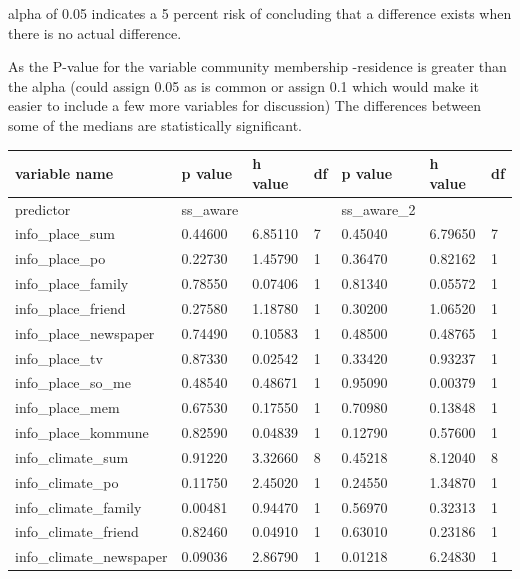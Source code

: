 alpha of 0.05 indicates a 5 percent
risk of concluding that a difference exists when there is no actual difference.

As the P-value for the variable community membership -residence is greater than the alpha (could assign 0.05 as is common or assign 0.1 which would make it easier to include a few more variables for discussion) The differences between some of the medians are statistically significant.

\begin{table}[h]
    \centering
    \begin{tabular}{|l|l|l|l|l|l|l|}
    \hline
        variable name & p value & h value & df & p value & h value & df \\ \hline
        predictor & ss\_aware & ~ & ~ & ss\_aware\_2 & ~ & ~ \\ \hline
        info\_place\_sum & 0.44600 & 6.85110 & 7 & 0.45040 & 6.79650 & 7 \\ \hline
        info\_place\_po & 0.22730 & 1.45790 & 1 & 0.36470 & 0.82162 & 1 \\ \hline
        info\_place\_family & 0.78550 & 0.07406 & 1 & 0.81340 & 0.05572 & 1 \\ \hline
        info\_place\_friend & 0.27580 & 1.18780 & 1 & 0.30200 & 1.06520 & 1 \\ \hline
        info\_place\_newspaper & 0.74490 & 0.10583 & 1 & 0.48500 & 0.48765 & 1 \\ \hline
        info\_place\_tv & 0.87330 & 0.02542 & 1 & 0.33420 & 0.93237 & 1 \\ \hline
        info\_place\_so\_me & 0.48540 & 0.48671 & 1 & 0.95090 & 0.00379 & 1 \\ \hline
        info\_place\_mem & 0.67530 & 0.17550 & 1 & 0.70980 & 0.13848 & 1 \\ \hline
        info\_place\_kommune & 0.82590 & 0.04839 & 1 & 0.12790 & 0.57600 & 1 \\ \hline
        info\_climate\_sum & 0.91220 & 3.32660 & 8 & 0.45218 & 8.12040 & 8 \\ \hline
        info\_climate\_po & 0.11750 & 2.45020 & 1 & 0.24550 & 1.34870 & 1 \\ \hline
        info\_climate\_family & 0.00481 & 0.94470 & 1 & 0.56970 & 0.32313 & 1 \\ \hline
        info\_climate\_friend & 0.82460 & 0.04910 & 1 & 0.63010 & 0.23186 & 1 \\ \hline
        info\_climate\_newspaper & 0.09036 & 2.86790 & 1 & 0.01218 & 6.24830 & 1 \\ \hline

\end{tabular}
\end{table}

